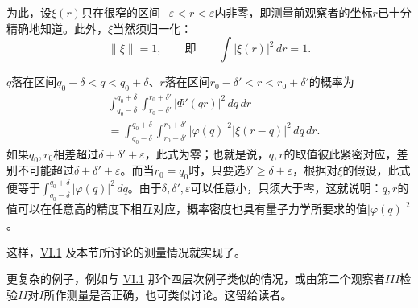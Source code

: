 \documentclass[fontsize=13pt,twoside,openany,headings=normal,parskip=false,bookmarkpackage=false,DIV=calc]{scrbook}
\begin{document}
为此，设$\xi(r)$只在很窄的区间$-\varepsilon<r<\varepsilon$内非零，即测量前观察者的坐标$r$已十分精确地知道。此外，$\xi$当然须归一化：
\[
 \|\xi\|=1,\qquad\text{即}\qquad\int|\xi(r)|^2\,dr=1.
\]

\hypertarget{origpage-237}{}\label{origpage-237}$q$落在区间$q_0-\delta<q<q_0+\delta$、$r$落在区间$r_0-\delta'<r<r_0+\delta'$的概率为
\begin{align*}
 &\int_{q_0-\delta}^{q_0+\delta}\int_{r_0-\delta'}^{r_0+\delta'}
 |\Phi'(qr)|^2\,dq\,dr\\
 &=\int_{q_0-\delta}^{q_0+\delta}\int_{r_0-\delta'}^{r_0+\delta'}
 |\varphi(q)|^2|\xi(r-q)|^2\,dq\,dr.
\end{align*}
如果$q_0,\allowbreak r_0$相差超过$\delta+\delta'+\varepsilon$，此式为零；也就是说，$q,\allowbreak r$的取值彼此紧密对应，差别不可能超过$\delta+\delta'+\varepsilon$。而当$r_0=q_0$时，只要选$\delta'\geq\delta+\varepsilon$，根据对$\xi$的假设，此式便等于$\int_{q_0-\delta}^{q_0+\delta}|\varphi(q)|^2\,dq$。由于$\delta,\allowbreak \delta',\allowbreak \varepsilon$可以任意小，只须大于零，这就说明：$q,\allowbreak r$的值可以在任意高的精度下相互对应，概率密度也具有量子力学所要求的值$|\varphi(q)|^2$。

这样，\hyperref[sec:VI.1]{VI.1} 及本节所讨论的测量情况就实现了。

更复杂的例子，例如与 \hyperref[sec:VI.1]{VI.1} 那个四层次例子类似的情况，或由第二个观察者$III$检验$II$对$I$所作测量是否正确，也可类似讨论。这留给读者。
\end{document}
